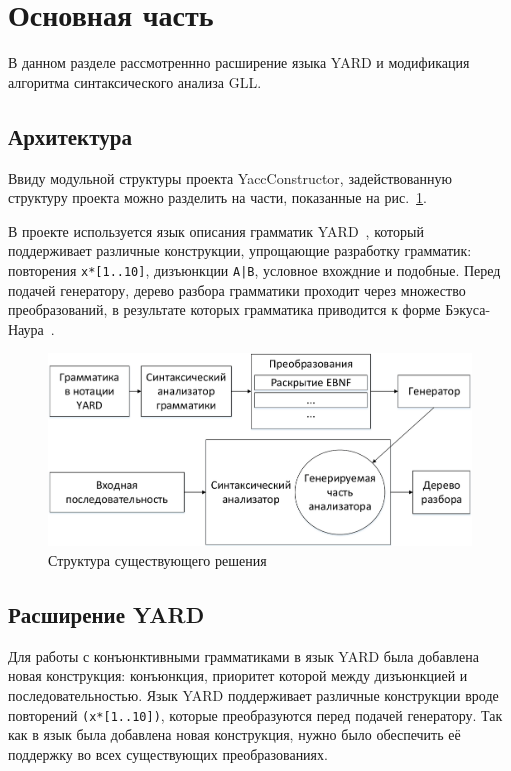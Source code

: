 \section{Основная часть}

В данном разделе рассмотреннно расширение языка YARD и модификация алгоритма синтаксического анализа GLL.


\subsection{Архитектура}

Ввиду модульной структуры проекта YaccConstructor, задействованную структуру проекта можно разделить на части, показанные на рис.~\ref{project_structure}.

В проекте используется язык описания грамматик YARD~\cite{YARD}, который поддерживает различные конструкции, упрощающие разработку грамматик: повторения \verb|x*[1..10]|, дизъюнкции \texttt{A|B}, условное вхождние и подобные. Перед подачей генератору, дерево разбора грамматики проходит через множество преобразований, в результате которых грамматика приводится к форме Бэкуса-Наура~\cite{BNF}.

\begin{figure}[h]
\centering
\includegraphics[width=\textwidth]{Gorokhov/courseworkpictures/img2.pdf}
\caption{Структура существующего решения}
\label{project_structure}
\end{figure}

\subsection{Расширение YARD}
Для работы с конъюнктивными грамматиками в язык YARD была добавлена новая конструкция: конъюнкция, приоритет которой между дизъюнкцией и последовательностью. Язык YARD поддерживает различные конструкции вроде повторений \verb|(x*[1..10])|, которые преобразуются перед подачей генератору. Так как в язык была добавлена новая конструкция, нужно было обеспечить её поддержку во всех существующих преобразованиях.

